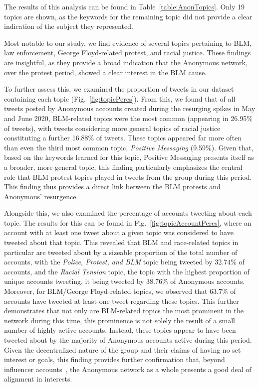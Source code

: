 \documentclass[letterpaper]{article}
\begin{document}
The results of this analysis can be found in Table~\ref{table:AnonTopics}. Only 19 topics are shown, as the keywords for the remaining topic did not provide a clear indication of the subject they represented.

Most notable to our study, we find evidence of several topics pertaining to BLM, law enforcement, George Floyd-related protest, and racial justice. These findings are insightful, as they provide a broad indication that the Anonymous network, over the protest period, showed a clear interest in the BLM cause.

To further assess this, we examined the proportion of tweets in our dataset containing each topic (Fig.~\ref{fig:topicPercs}). From this, we found that of all tweets posted by Anonymous accounts created during the resurging spikes in May and June 2020, BLM-related topics were the most common (appearing in 26.95\% of tweets), with tweets considering more general topics of racial justice constituting a further 16.88\% of tweets. These topics appeared far more often than even the third most common topic, \textit{Positive Messaging} (9.59\%). Given that, based on the keywords learned for this topic, Positive Messaging presents itself as a broader, more general topic, this finding particularly emphasizes the central role that BLM protest topics played in tweets from the group during this period. This finding thus provides a direct link between the BLM protests and Anonymous' resurgence.

Alongside this, we also examined the percentage of accounts tweeting about each topic. The results for this can be found in Fig.~\ref{fig:topicAccountPercs}, where an account with at least one tweet about a given topic was considered to have tweeted about that topic. This revealed that BLM and race-related topics in particular are tweeted about by a sizeable proportion of the total number of accounts, with the \textit{Police, Protest, and BLM} topic being tweeted by 32.74\% of accounts, and the \textit{Racial Tension} topic, the topic with the highest proportion of unique accounts tweeting, it being tweeted by 38.76\% of Anonymous accounts. Moreover, for BLM/George Floyd-related topics, we observed that 63.7\% of accounts have tweeted at least one tweet regarding these topics. This further demonstrates that not only are BLM-related topics the most prominent in the network during this time, this prominence is not solely the result of a small number of highly active accounts. Instead, these topics appear to have been tweeted about by the majority of Anonymous accounts active during this period. Given the decentralized nature of the group and their claims of having no set interest or goals, this finding provides further confirmation that, beyond influencer accounts~\cite{Jones2020}, the Anonymous network as a whole presents a good deal of alignment in interests.
\end{document}
